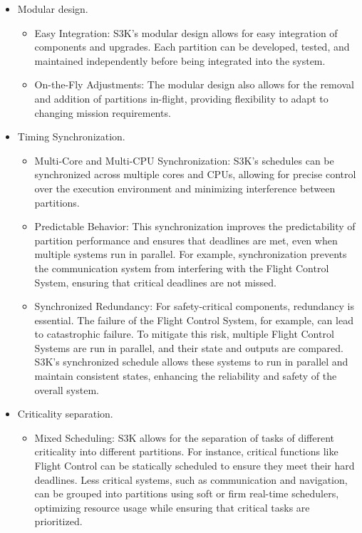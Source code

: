 \begin{itemize}
	\item Modular design. 
		\begin{itemize}			
			\item Easy Integration: 
				S3K's modular design allows for easy integration of components and upgrades. 
				Each partition can be developed, tested, and maintained independently before being integrated into the system.
			\item On-the-Fly Adjustments: 
				The modular design also allows for the removal and addition of partitions in-flight, providing flexibility to adapt to changing mission requirements.
		\end{itemize}
	\item Timing Synchronization. 
		\begin{itemize}
			\item Multi-Core and Multi-CPU Synchronization: 
				S3K's schedules can be synchronized across multiple cores and CPUs, allowing for precise control over the execution environment and minimizing interference between partitions.
			\item Predictable Behavior: 
				This synchronization improves the predictability of partition performance and ensures that deadlines are met, even when multiple systems run in parallel. 
				For example, synchronization prevents the communication system from interfering with the Flight Control System, ensuring that critical deadlines are not missed.
			\item Synchronized Redundancy: 
				For safety-critical components, redundancy is essential. 
				The failure of the Flight Control System, for example, can lead to catastrophic failure. 
				To mitigate this risk, multiple Flight Control Systems are run in parallel, and their state and outputs are compared.
				S3K's synchronized schedule allows these systems to run in parallel and maintain consistent states, enhancing the reliability and safety of the overall system.
		\end{itemize}
	\item Criticality separation.
		\begin{itemize}			
			\item Mixed Scheduling: 
				S3K allows for the separation of tasks of different criticality into different partitions. 
				For instance, critical functions like Flight Control can be statically scheduled to ensure they meet their hard deadlines.
				Less critical systems, such as communication and navigation, can be grouped into partitions using soft or firm real-time schedulers, optimizing resource usage while ensuring that critical tasks are prioritized.

\end{itemize}
\end{itemize}
